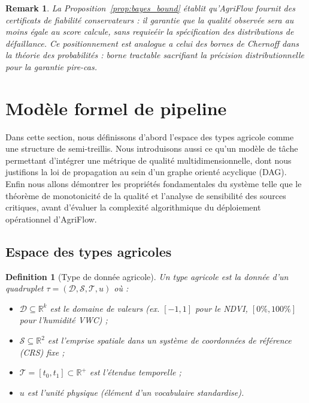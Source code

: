 \documentclass[12pt]{article}
\newtheorem{definition}{Definition}[section]
\newtheorem{remark}{Remark}[section]
\newcommand{\R}{\mathbb{R}}
\begin{document}
\begin{remark}
	La Proposition~\ref{prop:bayes_bound} établit qu'AgriFlow fournit des
	\emph{certificats de fiabilité conservateurs} : il garantie que la
	qualité observée sera au moins égale au score calcule, sans requieéir
	la spécification des distributions de défaillance.
	Ce positionnement est analogue a celui des bornes de Chernoff \cite{chernoff1952}
	dans la théorie des probabilités : borne tractable sacrifiant la
	précision distributionnelle pour la garantie pire-cas.
\end{remark}
\section{Modèle formel de pipeline}\label{sec3}
Dans cette section, nous définissons d'abord l'espace des types agricole comme une structure de semi-treillis. Nous introduisons aussi ce qu'un modèle de tâche permettant d'intégrer une métrique de qualité multidimensionnelle, dont nous justifions la loi de propagation au sein d'un graphe orienté acyclique (DAG). Enfin nous allons démontrer les propriétés fondamentales du système telle que le théorème de monotonicité de la qualité et l'analyse de sensibilité des sources critiques, avant d'évaluer la complexité algorithmique du déploiement opérationnel d'AgriFlow.



\subsection{Espace des types agricoles}
\label{subsec:types}

\begin{definition}[Type de donnée agricole]
	\label{def:type}
	Un \emph{type  agricole} est la donnée d'un quadruplet
	$\tau = (\mathcal{D}, \mathcal{S}, \mathcal{T}, u)$ où :
	\begin{itemize}
		\item $\mathcal{D} \subseteq \R^k$ est le domaine de valeurs
		(ex. $[-1,1]$ pour le NDVI, $[0\%,100\%]$ pour l'humidité VWC) ;
		\item $\mathcal{S} \subseteq \R^2$ est l'emprise spatiale dans un
		système de coordonnées de référence (CRS) fixe ;
		\item $\mathcal{T} = [t_0,t_1] \subset \R^+$ est l'étendue temporelle ;
		\item $u$ est l'unité physique (élément d'un vocabulaire standardise).
	\end{itemize}
\end{definition}
\end{document}
